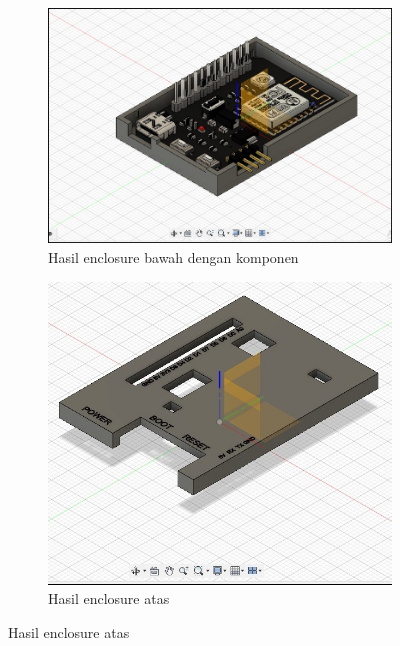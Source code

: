 \begin{figure}[H]
  \centering
  \begin{subfigure}[c]{0.4\linewidth}
    \centering
    \includegraphics[width=\linewidth]{img/modul_3/enclosure_bawah_withcomponent.jpg}
    \caption{Hasil enclosure bawah dengan komponen \label{fig:inisub1}}
  \end{subfigure}
  \hspace{1cm}
  \begin{subfigure}[c]{0.4\linewidth}
    \centering
    \includegraphics[width=\linewidth]{img/modul_3/enclosure_atas.jpg}
    \caption{Hasil enclosure atas \label{fig:inisub2}}
  \end{subfigure}
\end{figure}

